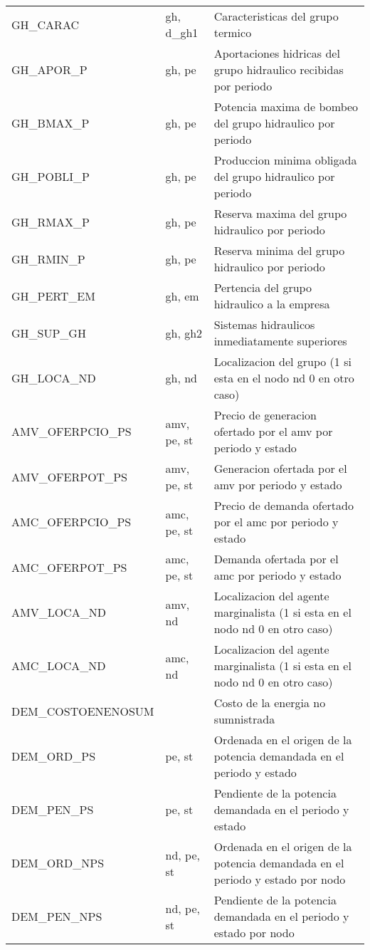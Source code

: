 \documentclass[11pt]{article}
\begin{document}
\begin{tabular}{|l|l|l|}
GH\_CARAC & gh, d\_gh1 & Caracteristicas del grupo termico \\ 
GH\_APOR\_P & gh, pe & Aportaciones hidricas del grupo hidraulico recibidas por periodo \\ 
GH\_BMAX\_P & gh, pe & Potencia maxima de bombeo del grupo hidraulico por periodo \\ 
GH\_POBLI\_P & gh, pe & Produccion minima obligada del grupo hidraulico por periodo \\ 
GH\_RMAX\_P & gh, pe & Reserva maxima del grupo hidraulico por periodo \\ 
GH\_RMIN\_P & gh, pe & Reserva minima del grupo hidraulico por periodo \\ 
GH\_PERT\_EM & gh, em & Pertencia del grupo hidraulico a la empresa \\ 
GH\_SUP\_GH & gh, gh2 & Sistemas hidraulicos inmediatamente superiores \\ 
GH\_LOCA\_ND & gh, nd & Localizacion del grupo (1 si esta en el nodo nd 0 en otro caso) \\ 
AMV\_OFERPCIO\_PS & amv, pe, st & Precio de generacion ofertado por el amv por periodo y estado \\ 
AMV\_OFERPOT\_PS & amv, pe, st & Generacion ofertada por el amv por periodo y estado \\ 
AMC\_OFERPCIO\_PS & amc, pe, st & Precio de demanda ofertado por el amc por periodo y estado \\ 
AMC\_OFERPOT\_PS & amc, pe, st & Demanda ofertada por el amc por periodo y estado \\ 
AMV\_LOCA\_ND & amv, nd & Localizacion del agente marginalista (1 si esta en el nodo nd 0 en otro caso) \\ 
AMC\_LOCA\_ND & amc, nd & Localizacion del agente marginalista (1 si esta en el nodo nd 0 en otro caso) \\ 
DEM\_COSTOENENOSUM &  & Costo de la energia no sumnistrada \\ 
DEM\_ORD\_PS & pe, st & Ordenada en el origen de la potencia demandada en el periodo y estado \\ 
DEM\_PEN\_PS & pe, st & Pendiente de la potencia demandada en el periodo y estado \\ 
DEM\_ORD\_NPS & nd, pe, st & Ordenada en el origen de la potencia demandada en el periodo y estado por nodo \\ 
DEM\_PEN\_NPS & nd, pe, st & Pendiente de la potencia demandada en el periodo y estado por nodo \\ 
\hline 
\end{tabular}
\end{document}
